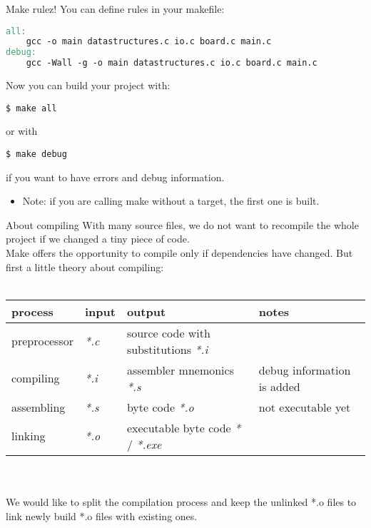 \begin{frame}[fragile]{Make rulez!}
	You can define rules in your makefile:
	\begin{lstlisting}[language=make,basicstyle=\scriptsize,numbers=none]
all:
	gcc -o main datastructures.c io.c board.c main.c
debug:
	gcc -Wall -g -o main datastructures.c io.c board.c main.c
    \end{lstlisting}
	Now you can build your project with:
	\begin{lstlisting}[basicstyle=\scriptsize,numbers=none]
$ make all
    \end{lstlisting}
	or with
	\begin{lstlisting}[basicstyle=\scriptsize,numbers=none]
$ make debug
    \end{lstlisting}
	if you want to have errors and debug information.
	\begin{itemize}
		\item Note: if you are calling make without a target, the first one is built.
	\end{itemize}
\end{frame}


\begin{frame}{About compiling}
	With many source files, we do not want to recompile the whole project if we changed a tiny piece of code.\\
	Make offers the opportunity to compile only if dependencies have changed. But first a little theory about compiling:\\\ \\
	\scriptsize
	\centering
	\begin{tabular}{|l|l|l|l|}
	\hline
	\textbf{process}	&	\textbf{input}	&	\textbf{output}										&	\textbf{notes}				\\\hline
	preprocessor		&	\textit{*.c}	&	source code with substitutions \textit{*.i}			&								\\\hline
	compiling			&	\textit{*.i}	&	assembler mnemonics \textit{*.s}					&	debug information is added	\\\hline
	assembling			&	\textit{*.s}	&	byte code \textit{*.o}								&	not executable yet			\\\hline
	linking				&	\textit{*.o}	&	executable byte code \textit{*} / \textit{*.exe}	&								\\\hline				
	\end{tabular}\ \\\ \\
	\flushleft
	\normalsize
	We would like to split the compilation process and keep the unlinked *.o files to link newly build *.o files with existing ones.
\end{frame}

